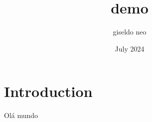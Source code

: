\documentclass{article}
\title{demo}
\author{giseldo neo}
\date{July 2024}
\begin{document}
\maketitle

\section{Introduction}

Olá mundo
\end{document}
